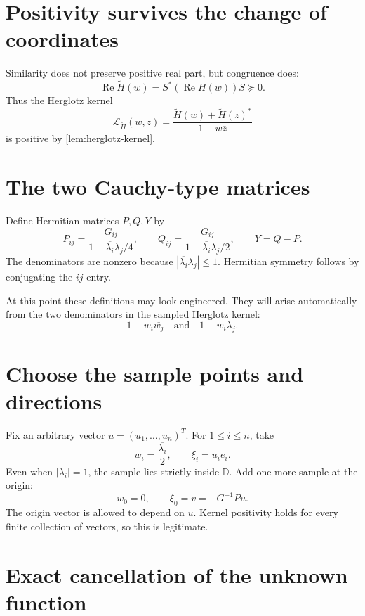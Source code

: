 \documentclass[11pt,oneside,openany]{book}
\theoremstyle{definition}
\theoremstyle{remark}
\newcommand{\D}{\mathbb D}
\newcommand{\RePart}{\operatorname{Re}}
\begin{document}
\section{Positivity survives the change of coordinates}

Similarity does not preserve positive real part, but congruence does:
\[
  \RePart\widetilde H(w)
  =S^*(\RePart H(w))S\succeq0.
\]
Thus the Herglotz kernel
\[
  \mathcal L_{\widetilde H}(w,z)
  =\frac{\widetilde H(w)+\widetilde H(z)^*}
         {1-w\overline z}
\]
is positive by \cref{lem:herglotz-kernel}.

\section{The two Cauchy-type matrices}

Define Hermitian matrices \(P,Q,Y\) by
\begin{equation}
  P_{ij}=\frac{G_{ij}}
  {1-\overline{\lambda_i}\lambda_j/4},
  \qquad
  Q_{ij}=\frac{G_{ij}}
  {1-\overline{\lambda_i}\lambda_j/2},
  \qquad
  Y=Q-P.
  \label{eq:PQY}
\end{equation}
The denominators are nonzero because
\(|\overline{\lambda_i}\lambda_j|\leq1\).  Hermitian symmetry follows
by conjugating the \(ij\)-entry.

At this point these definitions may look engineered.  They will arise
automatically from the two denominators in the sampled Herglotz
kernel:
\[
  1-w_i\overline{w_j}
  \quad\text{and}\quad
  1-w_i\lambda_j.
\]

\section{Choose the sample points and directions}

Fix an arbitrary vector \(u=(u_1,\ldots,u_n)^T\).  For
\(1\leq i\leq n\), take
\begin{equation}
  w_i=\frac{\overline{\lambda_i}}2,
  \qquad
  \xi_i=u_i e_i.
  \label{eq:eigen-samples}
\end{equation}
Even when \(|\lambda_i|=1\), the sample lies strictly inside \(\D\).
Add one more sample at the origin:
\begin{equation}
  w_0=0,
  \qquad
  \xi_0=v=-G^{-1}Pu.
  \label{eq:origin-sample}
\end{equation}
The origin vector is allowed to depend on \(u\).  Kernel positivity
holds for every finite collection of vectors, so this is legitimate.

\section{Exact cancellation of the unknown function}
\end{document}

